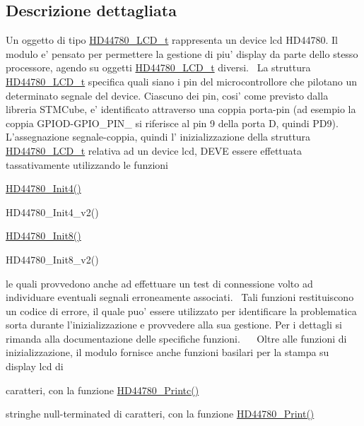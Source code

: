 \subsection{Descrizione dettagliata}
Un oggetto di tipo \hyperlink{struct_h_d44780___l_c_d__t}{H\+D44780\+\_\+\+L\+C\+D\+\_\+t} rappresenta un device lcd H\+D44780. Il modulo e' pensato per permettere la gestione di piu' display da parte dello stesso processore, agendo su oggetti \hyperlink{struct_h_d44780___l_c_d__t}{H\+D44780\+\_\+\+L\+C\+D\+\_\+t} diversi.~\newline
 La struttura \hyperlink{struct_h_d44780___l_c_d__t}{H\+D44780\+\_\+\+L\+C\+D\+\_\+t} specifica quali siano i pin del microcontrollore che pilotano un determinato segnale del device. Ciascuno dei pin, cosi' come previsto dalla libreria S\+T\+M\+Cube, e' identificato attraverso una coppia porta-\/pin (ad esempio la coppia G\+P\+I\+O\+D-\/\+G\+P\+I\+O\+\_\+\+P\+I\+N\+\_ si riferisce al pin 9 della porta D, quindi P\+D9). L'assegnazione segnale-\/coppia, quindi l' inizializzazione della struttura \hyperlink{struct_h_d44780___l_c_d__t}{H\+D44780\+\_\+\+L\+C\+D\+\_\+t} relativa ad un device lcd, D\+E\+V\+E essere effettuata tassativamente utilizzando le funzioni~\newline

\begin{DoxyItemize}
\item \hyperlink{group___h_d44780_gad8f777df204bc630b77924e0a96e5673}{H\+D44780\+\_\+\+Init4()}
\item H\+D44780\+\_\+\+Init4\+\_\+v2()
\item \hyperlink{group___h_d44780_ga2df14171c71a8afda59e3ae1733c5469}{H\+D44780\+\_\+\+Init8()}
\item H\+D44780\+\_\+\+Init8\+\_\+v2()~\newline

\end{DoxyItemize}

le quali provvedono anche ad effettuare un test di connessione volto ad individuare eventuali segnali erroneamente associati.~\newline
 Tali funzioni restituiscono un codice di errore, il quale puo' essere utilizzato per identificare la problematica sorta durante l'inizializzazione e provvedere alla sua gestione. Per i dettagli si rimanda alla documentazione delle specifiche funzioni.~\newline
 ~\newline
 Oltre alle funzioni di inizializzazione, il modulo fornisce anche funzioni basilari per la stampa su display lcd di
\begin{DoxyItemize}
\item caratteri, con la funzione \hyperlink{group___h_d44780_ga57b8c6ca0b3c12e5f7273b3c373a6f17}{H\+D44780\+\_\+\+Printc()}
\item stringhe null-\/terminated di caratteri, con la funzione \hyperlink{group___h_d44780_ga3aedff8e2040e62db569fde955d3987b}{H\+D44780\+\_\+\+Print()}~\newline

\end{DoxyItemize}

